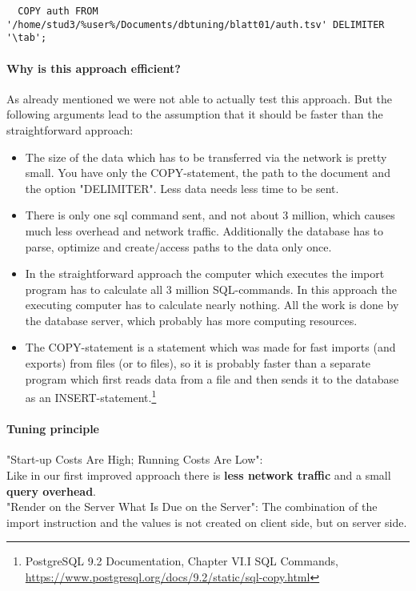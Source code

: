 \documentclass[11pt]{scrartcl}
\begin{document}
{\small
\begin{verbatim}
  COPY auth FROM '/home/stud3/%user%/Documents/dbtuning/blatt01/auth.tsv' DELIMITER '\tab';
\end{verbatim}
}

\paragraph{Why is this approach efficient?}

As already mentioned we were not able to actually test this approach. But the following arguments lead to the assumption that it should be faster than the straightforward approach:
\begin{itemize}
\item The size of the data which has to be transferred via the network is pretty small. You have only the COPY-statement, the path to the document and the option "DELIMITER". Less data needs less time to be sent.
\item There is only one sql command sent, and not about 3 million, which causes much less overhead and network traffic. Additionally the database has to parse, optimize and create/access paths to the data only once.
\item In the straightforward approach the computer which executes the import program has to calculate all  3 million SQL-commands. In this approach the executing computer has to calculate nearly nothing. All the work is done by the database server, which probably has more computing resources.
\item The COPY-statement is a statement which was made for fast imports (and exports) from files (or to files), so it is probably faster than a separate program which first reads data from a file and then sends it to the database as an INSERT-statement.\footnote{PostgreSQL 9.2
  Documentation, Chapter VI.I SQL Commands,
  \url{https://www.postgresql.org/docs/9.2/static/sql-copy.html}}
\end{itemize}


\paragraph{Tuning principle}
"Start-up Costs Are High; Running Costs Are Low":
\\
Like in our first improved approach there is \textbf{less network traffic} and a small \textbf{query overhead}.
\\
"Render on the Server What Is Due on the Server":
The combination of the import instruction and the values is not created on client side, but on server side.
\end{document}
